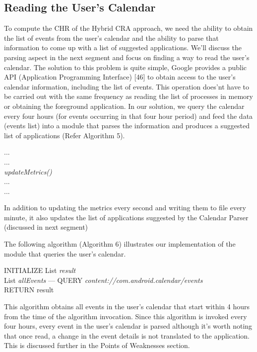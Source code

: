 \documentclass[12pt]{uthesis-v12}  %
\begin{document}
		\subsection{Reading the User's Calendar}
			To compute the CHR of the Hybrid CRA approach, we need the ability to obtain the list of events from the user's calendar and the ability to parse that information to come up with a list of suggested applications. We'll discuss the parsing aspect in the next segment and focus on finding a way to read the user's calendar. The solution to this problem is quite simple, Google provides a public API (Application Programming Interface) [46] to obtain access to the user's calendar information, including the list of events. This operation does'nt have to be carried out with the same frequency as reading the list of processes in memory or obtaining the foreground application. In our solution, we query the calendar every four hours (for events occurring in that four hour period) and feed the data (events list) into a module that parses the information and produces a suggested list of applications (Refer Algorithm 5). 
			
			\begin{algorithm}[H]
				\SetAlgoLined
				
				{	
					...\\
					...\\
					{\em updateMetrics()}\\
					...\\
					...\\	
				}
				
				\caption[Update Suggested Applications List]{In addition to updating the metrics every second and writing them to file every minute, it also updates the list of applications suggested by the Calendar Parser (discussed in next segment)}
			\end{algorithm}
			
			The following algorithm (Algorithm 6) illustrates our implementation of the module that queries the user's calendar.
			
			\begin{algorithm}[H]
				\SetAlgoLined
				INITIALIZE List {\em result}\\
				List {\em allEvents} ---  QUERY {\em content://com.android.calendar/events}\\
				{	
				}
				RETURN result
				\caption[Algorithm to read user's calendar]{This algorithm obtains all events in the user's calendar that start within 4 hours from the time of the algorithm invocation. Since this algorithm is invoked every four hours, every event in the user's calendar is parsed although it's worth noting that once read, a change in the event details is not translated to the application. This is discussed further in the Points of Weaknesses section.}
			\end{algorithm}
						
\end{document}
